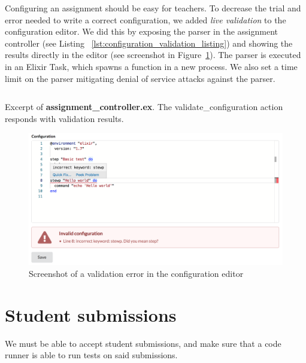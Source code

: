 Configuring an assignment should be easy for teachers. To decrease the trial and error needed to write a correct configuration, we added \emph{live validation} to the configuration editor. We did this by exposing the parser in the assignment controller (see Listing ~\ref{lst:configuration_validation_listing}) and showing the results directly in the editor (see screenshot in Figure~\ref{fig:editor_screenshot}). The parser is executed in an Elixir Task, which spawns a function in a new process. We also set a time limit on the parser mitigating denial of service attacks against the parser.

\begin{listing}
    \inputminted[firstline=29,lastline=36]{elixir}{code/server/lib/thesis_web/controllers/assignment_controller.ex}
    \caption{Excerpt of \textbf{assignment\_controller.ex}. The validate\_configuration action responds with validation results.}
    \label{lst:configuration_validation_listing}
\end{listing}

\begin{figure}
    \centering
    \includegraphics[width=\textwidth]{figure/screenshot_editor.png}
    \caption{Screenshot of a validation error in the configuration editor}
    \label{fig:editor_screenshot}
\end{figure}


\section{Student submissions}

We must be able to accept student submissions, and make sure that a code runner is able to run tests on said submissions.

